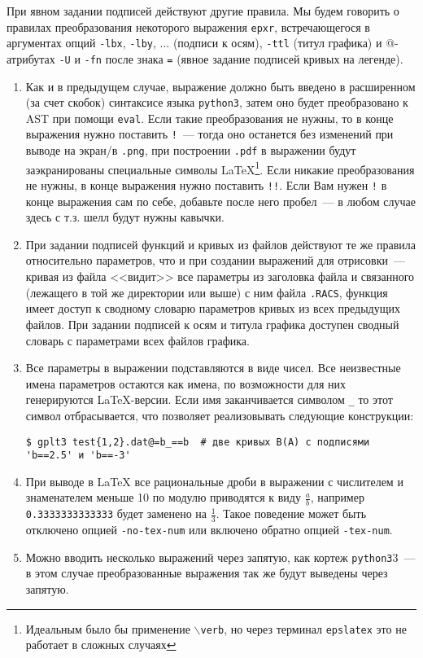 \documentclass[12pt]{article}
\def\python{{\tt python3}}
\def\png{{\tt .png}}
\def\pdf{{\tt .pdf}}
\begin{document}
При явном задании подписей действуют другие правила.
Мы будем говорить о правилах преобразования некоторого выражения \verb'epxr', встречающегося в аргументах опций
\verb'-lbx', \verb'-lby', ... (подписи к осям),  \verb'-ttl' (титул графика) и @-атрибутах \verb'-U' и \verb'-fn' после знака \verb'='
(явное задание подписей кривых на легенде).   
\begin{enumerate}
\item Как и в предыдущем случае, выражение должно быть введено в расширенном (за счет скобок) синтаксисе языка \python,
  затем оно будет преобразовано к AST при помощи \verb'eval'. Если такие преобразования не нужны, то в конце выражения
  нужно поставить \verb'!'~--- тогда оно останется без изменений при выводе на экран/в \png, при построении \pdf{} в выражении
  будут заэкранированы специальные символы \LaTeX{}\footnote{Идеальным было бы применение {\tt $\backslash$verb}, но через терминал {\tt epslatex}
    это не работает в сложных случаях}.  
  Если никакие преобразования не нужны, в конце выражения нужно поставить \verb'!!'. Если Вам нужен \verb'!' в конце выражения сам по себе,
  добавьте после него пробел~--- в любом случае здесь с т.з. шелл будут нужны кавычки.
\item При задании подписей функций и кривых из файлов действуют те же правила относительно параметров, что и при создании выражений для отрисовки~---
  кривая из файла <<видит>> все параметры из заголовка файла и связанного (лежащего в той же директории или выше) с ним файла \verb'.RACS',
  функция имеет доступ к сводному словарю параметров кривых из всех предыдущих файлов. При задании подписей к осям и титула графика
  доступен сводный словарь с параметрами всех файлов графика.
\item Все параметры в выражении подставляются в виде чисел.  Все неизвестные имена параметров остаются как имена, по возможности для них генерируются \LaTeX{}-версии.
  Если имя заканчивается символом \verb'_' то этот символ отбрасывается, что позволяет реализовывать следующие конструкции:
\begin{verbatim}
$ gplt3 test{1,2}.dat@=b_==b  # две кривых B(A) с подписями 'b==2.5' и 'b==-3'
\end{verbatim}
\item   При выводе в \LaTeX{} все рациональные дроби в выражении
  с числителем и знаменателем меньше 10 по модулю приводятся к виду $\frac ab$, например \verb'0.3333333333333' будет заменено на $\frac13$.
  Такое поведение может быть отключено  опцией \verb'-no-tex-num' или включено обратно опцией \verb'-tex-num'.
\item Можно вводить несколько выражений через запятую, как кортеж \python3~--- в этом случае преобразованные выражения так же будут выведены через запятую.
\end{enumerate}
\end{document}
